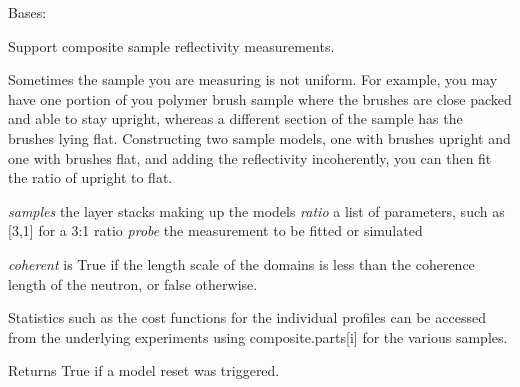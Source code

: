 \documentclass[letterpaper,10pt,english]{sphinxmanual}
\begin{document}
\begin{fulllineitems}
\label{api/experiment:refl1d.experiment.MixedExperiment}
Bases: {\hyperref[api/experiment:refl1d.experiment.ExperimentBase]{}}

Support composite sample reflectivity measurements.

Sometimes the sample you are measuring is not uniform.
For example, you may have one portion of you polymer
brush sample where the brushes are close packed and able
to stay upright, whereas a different section of the sample
has the brushes lying flat.  Constructing two sample
models, one with brushes upright and one with brushes
flat, and adding the reflectivity incoherently, you can
then fit the ratio of upright to flat.

\emph{samples} the layer stacks making up the models
\emph{ratio} a list of parameters, such as {[}3,1{]} for a 3:1 ratio
\emph{probe} the measurement to be fitted or simulated

\emph{coherent} is True if the length scale of the domains
is less than the coherence length of the neutron, or false
otherwise.

Statistics such as the cost functions for the individual
profiles can be accessed from the underlying experiments
using composite.parts{[}i{]} for the various samples.

\begin{fulllineitems}
\label{api/experiment:refl1d.experiment.MixedExperiment.amplitude}
\end{fulllineitems}


\begin{fulllineitems}
\label{api/experiment:refl1d.experiment.MixedExperiment.format_parameters}
\end{fulllineitems}


\begin{fulllineitems}
\label{api/experiment:refl1d.experiment.MixedExperiment.is_reset}
Returns True if a model reset was triggered.


\end{fulllineitems}
\end{fulllineitems}
\end{document}
